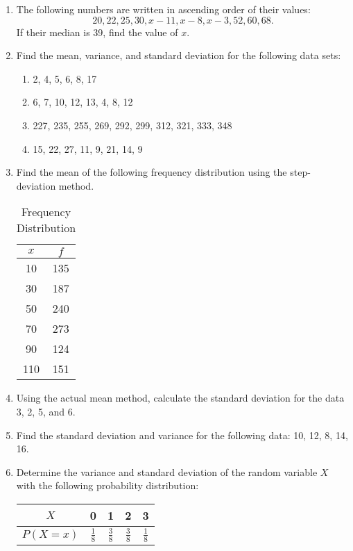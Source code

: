 \documentclass[11pt]{article}
\begin{document}
\begin{enumerate}
\item The following numbers are written in ascending order of their values:
\[
20, 22, 25, 30, x-11, x-8, x-3, 52, 60, 68.
\]
If their median is 39, find the value of \( x \).





\item Find the mean, variance, and standard deviation for the following data sets:

\begin{enumerate}
    \item 2, 4, 5, 6, 8, 17
    \item 6, 7, 10, 12, 13, 4, 8, 12
    \item 227, 235, 255, 269, 292, 299, 312, 321, 333, 348
    \item 15, 22, 27, 11, 9, 21, 14, 9
\end{enumerate}

\newpage
\item Find the mean of the following frequency distribution using the step-deviation method.

\begin{table}[h]
    \centering
    \begin{tabular}{cc}
        \toprule
        $x$ & $f$ \\
        \midrule
        10 & 135 \\
        30 & 187 \\
        50 & 240 \\
        70 & 273 \\
        90 & 124 \\
        110 & 151 \\
        \bottomrule
    \end{tabular}
    \caption{Frequency Distribution}
\end{table}


\item Using the actual mean method, calculate the standard deviation for the data 3, 2, 5, and 6.


\item Find the standard deviation and variance for the following data: 10, 12, 8, 14, 16.


\item Determine the variance and standard deviation of the random variable $X$ with the following probability distribution:

\begin{center}
\begin{tabular}{|c|c|c|c|c|}
\hline
$X$ & 0 & 1 & 2 & 3 \\
\hline
$P(X=x)$ & $\frac{1}{8}$ & $\frac{3}{8}$ & $\frac{3}{8}$ & $\frac{1}{8}$ \\
\hline
\end{tabular}
\end{center}





\end{enumerate}
\end{document}
